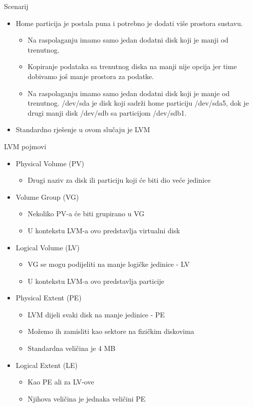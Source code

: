 \documentclass[croatian,t]{beamer} %
\begin{document}
	\begin{frame}{Scenarij}
		\begin{itemize}
			\item Home particija je postala puna i potrebno je dodati više prostora sustavu. 
			\begin{itemize}
				\item Na raspolaganju imamo samo jedan dodatni disk koji je manji od trenutnog.
				\item Kopiranje podataka sa trenutnog diska na manji nije opcija jer time dobivamo još manje prostora za podatke.
				\item Na raspolaganju imamo samo jedan dodatni disk koji je manje od trenutnog.  /dev/sda je disk koji sadrži home particiju /dev/sda5, dok je drugi manji disk /dev/sdb sa particijom /dev/sdb1.
			\end{itemize}
			\item Standardno rješenje u ovom slučaju je LVM			
		\end{itemize}
	\end{frame}		
	\begin{frame}{LVM pojmovi}
		\begin{itemize}
			\item Physical Volume (PV)
			\begin{itemize}
				\item Drugi naziv za disk ili particiju koji će biti dio veće jedinice
			\end{itemize}
			\item Volume Group (VG)
			\begin{itemize}
				\item Nekoliko PV-a će biti grupirano u VG
				\item U kontekstu LVM-a ovo predstavlja virtualni disk 
			\end{itemize}
			\item Logical Volume (LV)
			\begin{itemize}
				\item VG se mogu podijeliti na manje logičke jedinice - LV
				\item U kontekstu LVM-a ovo predstavlja particije
			\end{itemize}
			\item Physical Extent (PE)
			\begin{itemize}
				\item LVM dijeli svaki disk na manje jedinice - PE
				\item Možemo ih zamisliti kao sektore na fizičkim diskovima
				\item Standardna veličina je 4 MB
			\end{itemize}
			\item Logical Extent (LE)
			\begin{itemize}
				\item Kao PE ali za LV-ove
				\item Njihova veličina je jednaka veličini PE
			\end{itemize}
		\end{itemize}	
	\end{frame}	
\end{document}
